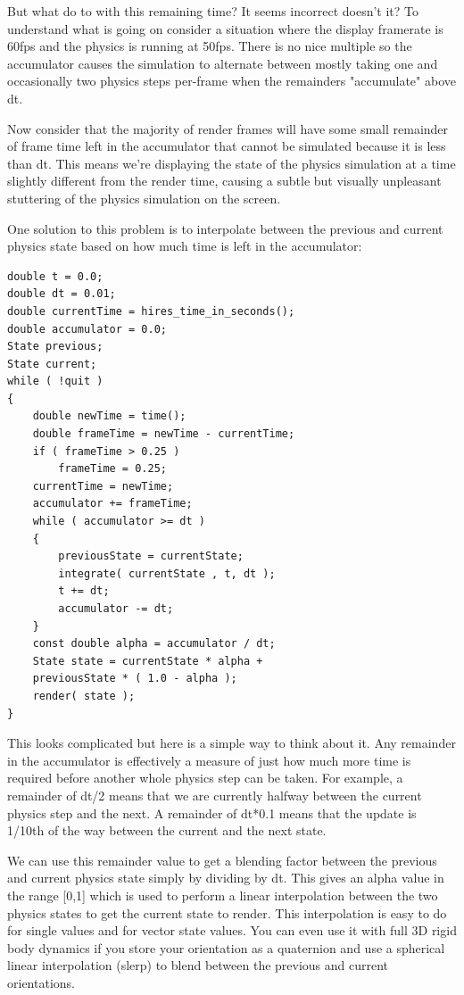 \documentclass[12pt]{article}
\begin{document}
But what do to with this remaining time? It seems incorrect doesn't it? To understand what is going on consider a situation where the display framerate is 60fps and the physics is running at 50fps. There is no nice multiple so the accumulator causes the simulation to alternate between mostly taking one and occasionally two physics steps per-frame when the remainders "accumulate" above dt.

Now consider that the majority of render frames will have some small remainder of frame time left in the accumulator that cannot be simulated because it is less than dt. This means we're displaying the state of the physics simulation at a time slightly different from the render time, causing a subtle but visually unpleasant stuttering of the physics simulation on the screen.

One solution to this problem is to interpolate between the previous and current physics state
based on how much time is left in the accumulator:

\begin{minipage}{\linewidth}\begin{lstlisting}
double t = 0.0;
double dt = 0.01;
double currentTime = hires_time_in_seconds();
double accumulator = 0.0;
State previous;
State current;
while ( !quit )
{
	double newTime = time();
	double frameTime = newTime - currentTime;
	if ( frameTime > 0.25 )
		frameTime = 0.25;
	currentTime = newTime;
	accumulator += frameTime;
	while ( accumulator >= dt )
	{
		previousState = currentState;
		integrate( currentState , t, dt );
		t += dt;
		accumulator -= dt;
	}
	const double alpha = accumulator / dt;
	State state = currentState * alpha +
	previousState * ( 1.0 - alpha );
	render( state );
}
\end{lstlisting}\end{minipage}

This looks complicated but here is a simple way to think about it. Any remainder in the accumulator is effectively a measure of just how much more time is required before another whole physics step can be taken. For example, a remainder of dt/2 means that we are currently halfway between the current physics step and the next. A remainder of dt*0.1 means that the update is 1/10th of the way between the current and the next state.

We can use this remainder value to get a blending factor between the previous and current physics state simply by dividing by dt. This gives an alpha value in the range [0,1] which is used to perform a linear interpolation between the two physics states to get the current state to render. This interpolation is easy to do for single values and for vector state values. You can even use it with full 3D rigid body dynamics if you store your orientation as a quaternion and use a spherical linear interpolation (slerp) to blend between the previous and current orientations.
\end{document}
